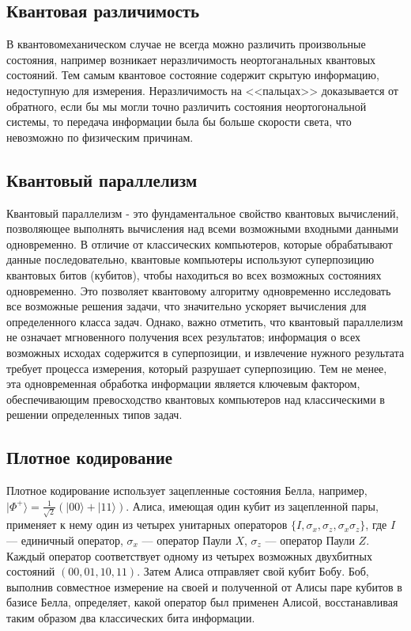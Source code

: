 \documentclass[12pt,a4paper]{article}
\begin{document}
		\subsection{Квантовая различимость}
		В квантовомеханическом случае не всегда можно различить произвольные состояния, например возникает неразличимость  неортоганальных квантовых состояний. Тем самым квантовое состояние содержит скрытую информацию, недоступную для измерения. Неразличимость на <<пальцах>> доказывается от обратного, если бы мы могли точно различить состояния неортогональной системы, то передача информации была бы больше скорости света, что невозможно по физическим причинам\cite{1}.		
		\subsection{Квантовый параллелизм}

		Квантовый параллелизм - это фундаментальное свойство квантовых вычислений, позволяющее выполнять вычисления над всеми возможными входными данными одновременно. В отличие от классических компьютеров, которые обрабатывают данные последовательно, квантовые компьютеры используют суперпозицию квантовых битов (кубитов), чтобы находиться во всех возможных состояниях одновременно. Это позволяет квантовому алгоритму одновременно исследовать все возможные решения задачи, что значительно ускоряет вычисления для определенного класса задач. Однако, важно отметить, что квантовый параллелизм не означает мгновенного получения всех результатов; информация о всех возможных исходах содержится в суперпозиции, и извлечение нужного результата требует процесса измерения, который разрушает суперпозицию. Тем не менее, эта одновременная обработка информации является ключевым фактором, обеспечивающим превосходство квантовых компьютеров над классическими в решении определенных типов задач.
		\subsection{Плотное кодирование}
		Плотное кодирование использует зацепленные состояния Белла, например, $|\Phi^+\rangle = \frac{1}{\sqrt{2}}(|00\rangle + |11\rangle)$. Алиса, имеющая один кубит из зацепленной пары, применяет к нему один из четырех унитарных операторов $\{I, \sigma_x, \sigma_z, \sigma_x \sigma_z\}$, где $I$ — единичный оператор, $\sigma_x$ — оператор Паули $X$, $\sigma_z$ — оператор Паули $Z$. Каждый оператор соответствует одному из четырех возможных двухбитных состояний $(00, 01, 10, 11)$. Затем Алиса отправляет свой кубит Бобу. Боб, выполнив совместное измерение на своей и полученной от Алисы паре кубитов в базисе Белла, определяет, какой оператор был применен Алисой, восстанавливая таким образом два классических бита информации.
\end{document}
